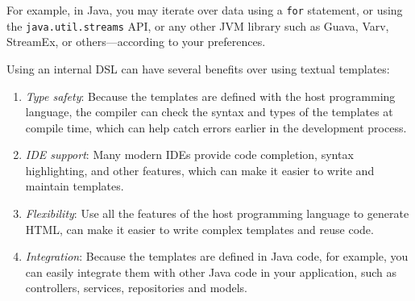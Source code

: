 For example, in Java, you may iterate over data using a \texttt{for} statement,
or using the \texttt{java.util.streams} API, or any other JVM library such as
Guava, Varv, StreamEx, or others—according to your preferences.

Using an internal DSL can have several benefits over using textual templates:
\begin{enumerate}
  \item \emph{Type safety}: Because the templates are defined with the host
  programming language, the compiler can check the syntax and types of the
  templates at compile time, which can help catch errors earlier in the
  development process.

  \item \emph{IDE support}: Many modern IDEs provide code completion, syntax
  highlighting, and other features, which can make it easier to write and
  maintain templates.
  
  \item \emph{Flexibility}: Use all the features of the host programming language
  to generate HTML, can make it easier to write complex templates and reuse code.
  
  \item \emph{Integration}: Because the templates are defined in Java code, for
  example, you can easily integrate them with other Java code in your
  application, such as controllers, services, repositories and models.
  
\end{enumerate}

